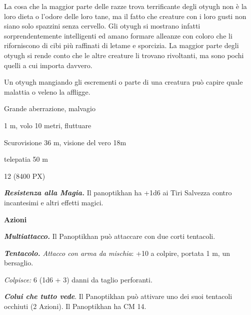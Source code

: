\begin{multicols}{2}
{La cosa che la maggior parte delle razze trova terrificante degli otyugh non è la loro dieta o l'odore delle loro tane, ma il fatto che creature con i loro gusti non siano solo spazzini senza cervello. Gli otyugh si mostrano infatti sorprendentemente intelligenti ed amano formare alleanze con coloro che li riforniscono di cibi più raffinati di letame e sporcizia. La maggior parte degli otyugh si rende conto che le altre creature li trovano rivoltanti, ma sono pochi quelli a cui importa davvero.

Un otyugh mangiando gli escrementi o parte di una creatura può capire quale malattia o veleno la affligge.


\begin{description}[noitemsep, topsep=0pt, parsep=0pt, partopsep=0pt, itemsep=1pt, leftmargin=2.35cm,  labelwidth=2.2cm, itemindent=0cm, listparindent=0pt] %
\setlength{\baselineskip}{10pt}
\item[\textbf{Taglia/Tipo}] Grande aberrazione, malvagio
\item[\textbf{Caratt.}] 
\item[\textbf{Punti Ferita}] 
\item[\textbf{Movimento}] 1 m, volo 10 metri, fluttuare
\item[\textbf{Tiri Salvez.}] 
\item[\textbf{Sensi}] Scurovisione 36 m, visione del vero 18m
\item[\textbf{Linguaggi}] telepatia 50 m
\item[\textbf{Sfida}] 12 (8400 PX)
\end{description}
\smallskip

\emph{\textbf{Resistenza alla Magia.}} Il panoptikhan ha +1d6 ai Tiri Salvezza contro incantesimi e altri effetti magici.

\textbf{Azioni}

\emph{\textbf{Multiattacco.}} Il Panoptikhan può attaccare con due corti tentacoli.

\emph{\textbf{Tentacolo.} Attacco con arma da mischia}: +10 a colpire, portata 1 m, un bersaglio.

\emph{Colpisce:} 6 (1d6 + 3) danni da taglio perforanti.

\emph{\textbf{Colui che tutto vede}}. Il Panoptikhan può attivare uno dei suoi tentacoli occhiuti (2 Azioni). Il Panoptikhan ha CM 14.

}
\end{multicols}
